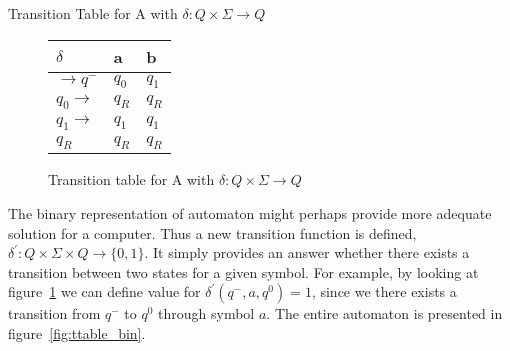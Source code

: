 \documentclass[runningheads,a4paper]{llncs}
\begin{document}
Transition Table for A with $\delta: Q \times \Sigma \rightarrow Q$ 

\begin{figure}
\begin{center}

	\setlength{\tabcolsep}{4pt}
	\renewcommand{\arraystretch}{1.5}
	
	\begin{tabular}{|P{1.0cm} || P{0.6cm} | P{0.6cm} |}
	\hline
	$\delta$ & a & b \\
	\hline
	\hline
	$\rightarrow q^-$ 		& $q_0$ & $q_1$ \\
	\hline
	$q_0 \rightarrow$ 		& $q_R$ & $q_R$ \\
	\hline
	$q_1 \rightarrow$ 		& $q_1$ & $q_1$ \\
	\hline
	$q_R$  					& $q_R$ & $q_R$ \\
	\hline
	\end{tabular}

	
\caption{Transition table for A with $\delta: Q \times \Sigma \rightarrow Q$}
\label{fig:ttable_std}
\end{center}
\end{figure}


The binary representation of automaton might perhaps provide more adequate solution for a computer. Thus a new transition function is defined, $\delta^{'}: Q \times \Sigma \times Q \rightarrow \{0,1\}$. It simply provides an answer whether there exists a transition between two states for a given symbol. For example, by looking at figure~\ref{fig:ttable_std} we can define value for $\delta^{'}(q^-,a,q^0) = 1$, since we there exists a transition from $q^-$ to $q^0$ through symbol $a$. The entire automaton is presented in figure~\ref{fig:ttable_bin}.
\end{document}
